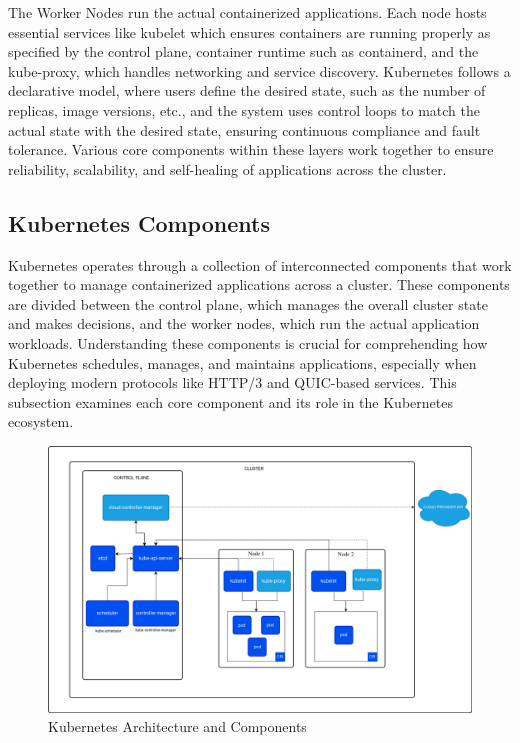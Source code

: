The Worker Nodes run the actual containerized applications. Each node hosts essential services like kubelet which ensures containers are running properly as specified by the control plane, container runtime such as containerd, and the kube-proxy, which handles networking and service discovery. Kubernetes follows a declarative model, where users define the desired state, such as the number of replicas, image versions, etc., and the system uses control loops to match the actual state with the desired state, ensuring continuous compliance and fault tolerance. Various core components within these layers work together to ensure reliability, scalability, and self-healing of applications across the cluster.

\subsection{Kubernetes Components}

Kubernetes operates through a collection of interconnected components that work together to manage containerized applications across a cluster. These components are divided between the control plane, which manages the overall cluster state and makes decisions, and the worker nodes, which run the actual application workloads. Understanding these components is crucial for comprehending how Kubernetes schedules, manages, and maintains applications, especially when deploying modern protocols like HTTP/3 and QUIC-based services. This subsection examines each core component and its role in the Kubernetes ecosystem.

\begin{figure}[H]
\centering
\includegraphics[width=1\textwidth]{SOA/kubernetes-cluster-architecture.png}
\caption{Kubernetes Architecture and Components}
\label{fig:k8s-architecture}
\end{figure}

